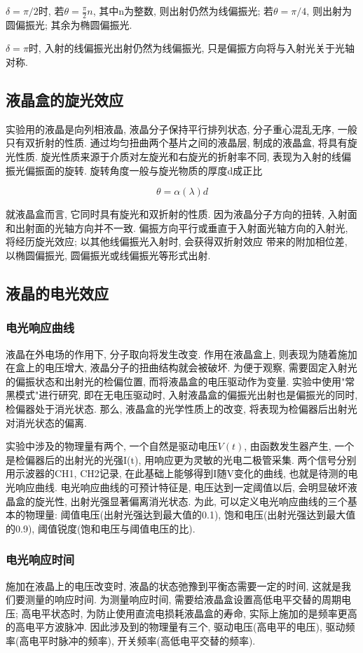 \documentclass[12pt,a4paper]{article}
\newcommand{\be}[1]{
    \begin{equation}
        #1
    \end{equation}
}
\begin{document}
$\delta=\pi/2$时, 若$\theta=\frac{\pi}{2}n$, 其中n为整数, 则出射仍然为线偏振光; 若$\theta=\pi/4$, 则出射为圆偏振光; 其余为椭圆偏振光. 

$\delta=\pi$时, 入射的线偏振光出射仍然为线偏振光, 只是偏振方向将与入射光关于光轴对称. 

\subsection{液晶盒的旋光效应}
实验用的液晶是向列相液晶, 液晶分子保持平行排列状态, 分子重心混乱无序, 一般只有双折射的性质. 通过均匀扭曲两个基片之间的液晶层, 制成的液晶盒, 将具有旋光性质. 
旋光性质来源于介质对左旋光和右旋光的折射率不同, 表现为入射的线偏振光偏振面的旋转. 旋转角度一般与旋光物质的厚度d成正比
\be{\theta=\alpha(\lambda)d}
就液晶盒而言, 它同时具有旋光和双折射的性质. 因为液晶分子方向的扭转, 入射面和出射面的光轴方向并不一致. 偏振方向平行或垂直于入射面光轴方向的入射光, 将经历旋光效应; 以其他线偏振光入射时, 会获得双折射效应
带来的附加相位差, 以椭圆偏振光, 圆偏振光或线偏振光等形式出射. 
\subsection{液晶的电光效应}
\subsubsection{电光响应曲线}
液晶在外电场的作用下, 分子取向将发生改变. 作用在液晶盒上, 则表现为随着施加在盒上的电压增大, 液晶分子的扭曲结构就会被破坏. 为便于观察, 需要固定入射光的偏振状态和出射光的检偏位置, 而将液晶盒的电压驱动作为变量. 实验中使用"常黑模式"进行研究, 即在无电压驱动时, 入射液晶盒的偏振光出射也是偏振光的同时, 
检偏器处于消光状态. 那么, 液晶盒的光学性质上的改变, 将表现为检偏器后出射光对消光状态的偏离. 

实验中涉及的物理量有两个, 一个自然是驱动电压$V(t)$, 由函数发生器产生, 一个是检偏器后的出射光的光强I(t), 用响应更为灵敏的光电二极管采集. 两个信号分别用示波器的CH1, CH2记录, 在此基础上能够得到I随V变化的曲线, 也就是待测的电光响应曲线. 
电光响应曲线的可预计特征是, 电压达到一定阈值以后, 会明显破坏液晶盒的旋光性, 出射光强显著偏离消光状态. 为此, 可以定义电光响应曲线的三个基本的物理量: 阈值电压(出射光强达到最大值的0.1), 饱和电压(出射光强达到最大值的0.9), 阈值锐度(饱和电压与阈值电压的比). 
\subsubsection{电光响应时间}
施加在液晶上的电压改变时, 液晶的状态弛豫到平衡态需要一定的时间, 这就是我们要测量的响应时间. 为测量响应时间, 
需要给液晶盒设置高低电平交替的周期电压; 高电平状态时, 为防止使用直流电损耗液晶盒的寿命, 实际上施加的是频率更高的高电平方波脉冲. 因此涉及到的物理量有三个, 驱动电压(高电平的电压), 驱动频率(高电平时脉冲的频率), 开关频率(高低电平交替的频率). 
\end{document}
